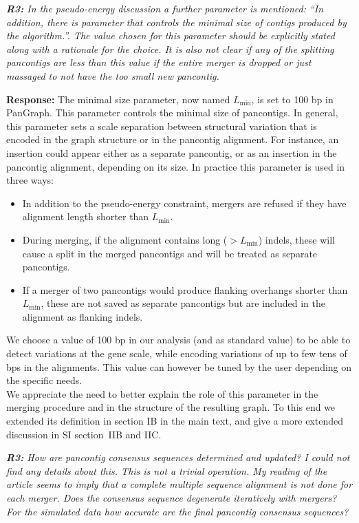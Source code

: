 \documentclass[aps,rmp,onecolumn]{revtex4-1}
\newcommand{\Lthr}{L_{\min}}
\newcommand{\reviewer}[2]{{\it \textbf{#1:} #2\vskip 5mm}}
\newcommand{\response}[1]{{{\color{response}\textbf{Response:} #1}}\vskip 5mm}
\newcommand{\SIalgo}{II}
\begin{document}
\reviewer{R3}{In the pseudo-energy discussion a further parameter is mentioned: ``In addition, there is parameter that controls the minimal size of contigs produced by the algorithm.''. The value chosen for this parameter should be explicitly stated along with a rationale for the choice. It is also not clear if any of the splitting pancontigs are less than this value if the entire merger is dropped or just massaged to not have the too small new pancontig.}
\response{The minimal size parameter, now named $\Lthr$, is set to 100 bp in PanGraph. This parameter controls the minimal size of pancontigs. In general, this parameter sets a scale separation between structural variation that is encoded in the graph structure or in the pancontig alignment. 
For instance, an insertion could appear either as a separate pancontig, or as an insertion in the pancontig alignment, depending on its size. 
In practice this parameter is used in three ways:
      \begin{itemize}
            \item In addition to the pseudo-energy constraint, mergers are refused if they have alignment length shorter than $\Lthr$.
            \item During merging, if the alignment contains long ($> \Lthr$) indels, these will cause a split in the merged pancontigs and will be treated as separate pancontigs.
            \item If a merger of two pancontigs would produce flanking overhangs shorter than $\Lthr$, these are not saved as separate pancontigs but are included in the alignment as flanking indels.
      \end{itemize}
      We choose a value of 100 bp in our analysis (and as standard value) to be able to detect variations at the gene scale, while encoding variations of up to few tens of bps in the alignments. This value can however be tuned by the user depending on the specific needs.\\
      We appreciate the need to better explain the role of this parameter in the merging procedure and in the structure of the resulting graph. To this end we extended its definition in section IB in the main text, and give a more extended discussion in SI section~\SIalgo B and \SIalgo C.\\
}

\reviewer{R3}{How are pancontig consensus sequences determined and updated? I could not find any details about this. This is not a trivial operation. My reading of the article seems to imply that a complete multiple sequence alignment is not done for each merger. Does the consensus sequence degenerate iteratively with mergers? For the simulated data how accurate are the final pancontig consensus sequences?}
\end{document}

